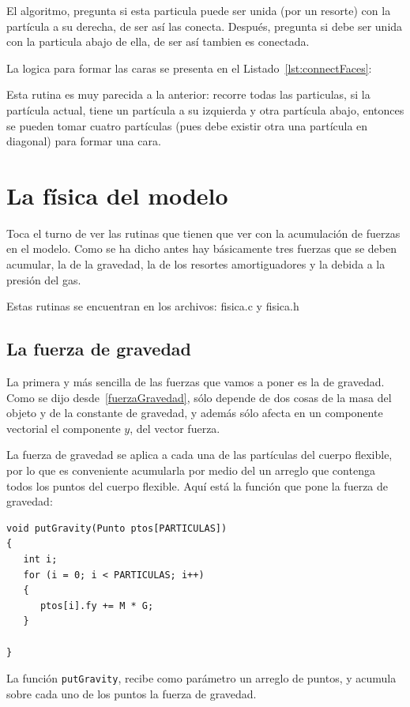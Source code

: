 El algoritmo, pregunta si esta particula puede ser unida (por un resorte) con la partícula a su derecha, de ser así las conecta. Después, pregunta si debe ser unida con la particula abajo de ella, de ser así tambien es conectada.

La logica para formar las caras se presenta en el Listado~\ref{lst:connectFaces}: 
{\centering
\begin{minipage}{\linewidth}
\end{minipage}
\par
}

Esta rutina es muy parecida a la anterior: recorre todas las particulas, si la partícula actual, tiene un partícula a su izquierda y otra partícula abajo, entonces se pueden tomar cuatro partículas (pues debe existir otra una partícula en diagonal) para formar una cara.

\section{La física del modelo}
Toca el turno de ver las rutinas que tienen que ver con la acumulación de fuerzas en el modelo.
Como se ha dicho antes hay básicamente tres fuerzas que se deben acumular, la de la gravedad, la de los resortes amortiguadores y la debida a la presión del gas.

Estas rutinas se encuentran en los archivos: fisica.c y fisica.h
\subsection{La fuerza de gravedad}
La primera y más sencilla de las fuerzas que vamos a poner es la de gravedad.
Como se dijo desde~\ref{fuerzaGravedad}, sólo depende de dos cosas de la masa del objeto y de la constante de gravedad, y además sólo afecta en un componente vectorial el componente $y$, del vector fuerza.

La fuerza de gravedad se aplica a cada una de las partículas del cuerpo flexible, por lo que es conveniente acumularla por medio del un arreglo que contenga todos los puntos del cuerpo flexible.
Aquí está la función que pone la fuerza de gravedad:
\begin{verbatim}
void putGravity(Punto ptos[PARTICULAS])
{
   int i;
   for (i = 0; i < PARTICULAS; i++)
   {
      ptos[i].fy += M * G;
   }

}
\end{verbatim} 
La función \verb|putGravity|, recibe como parámetro un arreglo de puntos, y acumula sobre cada uno de los puntos la fuerza de gravedad.

